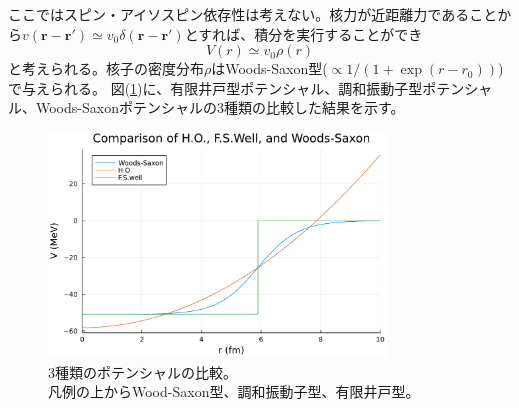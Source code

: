 \documentclass[a4paper,11pt]{jsreport}
\begin{document}
  ここではスピン・アイソスピン依存性は考えない。核力が近距離力であることから\(v(\bm{r}-\bm{r}')\simeq v_0\delta(\bm{r}-\bm{r}')\)とすれば、積分を実行することができ
  \begin{equation}
    V(r)\simeq v_0\rho(r)
  \end{equation}
  と考えられる。核子の密度分布\(\rho\)はWoods-Saxon型(\(\propto 1/(1+\exp(r-r_0))\))で与えられる。
  図(\ref{potential})に、有限井戸型ポテンシャル、調和振動子型ポテンシャル、Woods-Saxonポテンシャルの3種類の比較した結果を示す。
  \begin{figure}[H]
    \centering
    \includegraphics[width=0.8\textwidth]{main_fig/Comp_pt.pdf}
    \caption{3種類のポテンシャルの比較。\\
    凡例の上からWood-Saxon型、調和振動子型、有限井戸型。}
    \label{potential}
  \end{figure}
\end{document}
